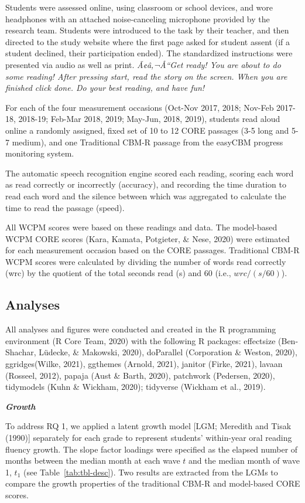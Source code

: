 \documentclass[
  english,
  man, fleqn, noextraspace]{apa6}
\begin{document}
Students were assessed online, using classroom or school devices, and wore headphones with an attached noise-canceling microphone provided by the research team. Students were introduced to the task by their teacher, and then directed to the study website where the first page asked for student assent (if a student declined, their participation ended). The standardized instructions were presented via audio as well as print. \emph{Ã¢â‚¬Å``Get ready! You are about to do some reading! After pressing start, read the story on the screen. When you are finished click done. Do your best reading, and have fun!}

For each of the four measurement occasions (Oct-Nov 2017, 2018; Nov-Feb 2017-18, 2018-19; Feb-Mar 2018, 2019; May-Jun, 2018, 2019), students read aloud online a randomly assigned, fixed set of 10 to 12 CORE passages (3-5 long and 5-7 medium), and one Traditional CBM-R passage from the easyCBM progress monitoring system.

The automatic speech recognition engine scored each reading, scoring each word as read correctly or incorrectly (accuracy), and recording the time duration to read each word and the silence between which was aggregated to calculate the time to read the passage (speed).

All WCPM scores were based on these readings and data. The model-based WCPM CORE scores (Kara, Kamata, Potgieter, \& Nese, 2020) were estimated for each measurement occasion based on the CORE passages. Traditional CBM-R WCPM scores were calculated by dividing the number of words read correctly (wrc) by the quotient of the total seconds read (s) and 60 (i.e., \(wrc/(s/60)\)).

\hypertarget{analyses}{%
\subsection{Analyses}\label{analyses}}

All analyses and figures were conducted and created in the R programming environment (R Core Team, 2020) with the following R packages: effectsize (Ben-Shachar, Lüdecke, \& Makowski, 2020), doParallel (Corporation \& Weston, 2020), ggridges(Wilke, 2021), ggthemes (Arnold, 2021), janitor (Firke, 2021), lavaan (Rosseel, 2012), papaja (Aust \& Barth, 2020), patchwork (Pedersen, 2020), tidymodels (Kuhn \& Wickham, 2020); tidyverse (Wickham et al., 2019).

\textbf{\emph{Growth}}

To address RQ 1, we applied a latent growth model {[}LGM; Meredith and Tisak (1990){]} separately for each grade to represent students' within-year oral reading fluency growth. The slope factor loadings were specified as the elapsed number of months between the median month at each wave \(t\) and the median month of wave 1, \(t_1\) (see Table~\ref{tab:tbl-desc}). Two results are extracted from the LGMs to compare the growth properties of the traditional CBM-R and model-based CORE scores.
\end{document}
